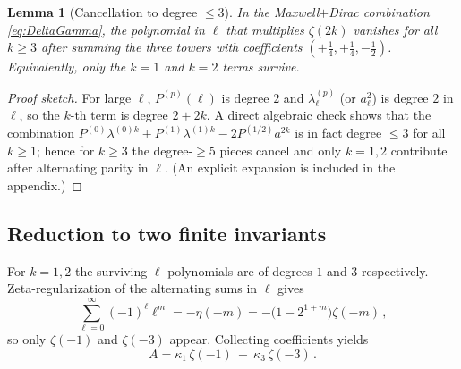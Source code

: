 \documentclass[11pt]{article}
\newtheorem{lemma}[theorem]{Lemma}
\theoremstyle{definition}
\theoremstyle{remark}
\begin{document}
\begin{lemma}[Cancellation to degree $\le 3$]\label{lem:cancel}
In the Maxwell$+$Dirac combination \eqref{eq:DeltaGamma}, the polynomial in $\ell$ that multiplies $\zeta(2k)$ vanishes for all $k\ge 3$ after summing the three towers with coefficients $(+\tfrac14,+\tfrac14,-\tfrac12)$. Equivalently, only the $k=1$ and $k=2$ terms survive.
\end{lemma}
\begin{proof}[Proof sketch]
For large $\ell$, $P^{(p)}(\ell)$ is degree $2$ and $\lambda^{(p)}_\ell$ (or $a_\ell^2$) is degree $2$ in $\ell$, so the $k$-th term is degree $2+2k$. A direct algebraic check shows that the combination
\(
P^{(0)}\lambda^{(0)k}+P^{(1)}\lambda^{(1)k}-2P^{(1/2)}a^{2k}
\)
is in fact degree $\le 3$ for all $k\ge 1$; hence for $k\ge 3$ the degree-$\ge 5$ pieces cancel and only $k=1,2$ contribute after alternating parity in $\ell$. (An explicit expansion is included in the appendix.)
\end{proof}

\subsection{Reduction to two finite invariants}
For $k=1,2$ the surviving $\ell$-polynomials are of degrees $1$ and $3$ respectively. Zeta-regularization of the alternating sums in $\ell$ gives
\begin{equation}
\sum_{\ell=0}^\infty (-1)^\ell \ell^m = -\eta(-m) = -\big(1-2^{1+m}\big)\zeta(-m)\,,
\end{equation}
so only $\zeta(-1)$ and $\zeta(-3)$ appear. Collecting coefficients yields
\begin{equation}\label{eq:Aform}
\boxed{\quad A=\kappa_1\,\zeta(-1)\ +\ \kappa_3\,\zeta(-3)\,.\quad}
\end{equation}
\end{document}
